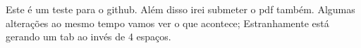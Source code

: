 \documentclass{article}
\begin{document}
	Este é um teste para o github.
	Além disso irei submeter o pdf também.
	Algumas alterações ao mesmo tempo vamos ver o que acontece;
	Estranhamente está gerando um tab ao invés de 4 espaços.
\end{document}
